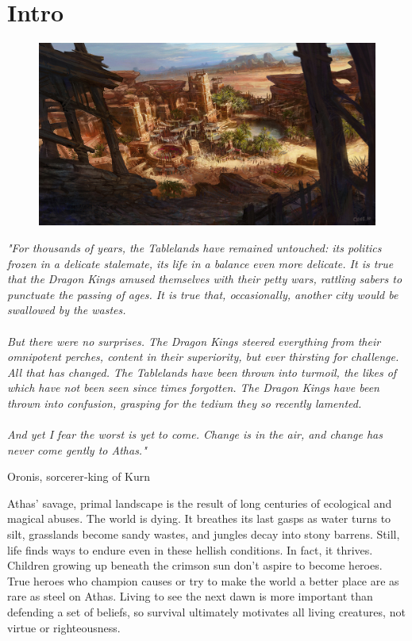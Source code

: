 \chapter{Intro}\label{chap:intro}

\begin{figure}[!htb]
\centering
\includegraphics[width=0.8\linewidth]{images/city.jpg}
\end{figure}

\epigraph{\textit{
"For thousands of years, the Tablelands have remained untouched: its politics frozen in a delicate stalemate,
its life in a balance even more delicate. It is true that the Dragon Kings amused themselves with their petty
wars, rattling sabers to punctuate the passing of ages. It is true that, occasionally, another city would be
swallowed by the wastes.\\
\\
But there were no surprises. The Dragon Kings steered everything from their omnipotent perches, content in
their superiority, but ever thirsting for challenge. All that has changed. The Tablelands have been thrown into
turmoil, the likes of which have not been seen since times forgotten. The Dragon Kings have been thrown
into confusion, grasping for the tedium they so recently lamented.\\
\\
And yet I fear the worst is yet to come. Change is in the air, and change has never come gently to Athas."
} }{
Oronis, sorcerer‐king of Kurn
}

Athas' savage, primal landscape is the result of long centuries of ecological and magical abuses. The world is
dying. It breathes its last gasps as water turns to silt, grasslands become sandy wastes, and jungles decay into
stony barrens. Still, life finds ways to endure even in these hellish conditions. In fact, it thrives.
Children growing up beneath the crimson sun don’t aspire to become heroes. True heroes who champion causes
or try to make the world a better place are as rare as steel on Athas. Living to see the next dawn is more
important than defending a set of beliefs, so survival ultimately motivates all living creatures, not virtue or
righteousness.\\

